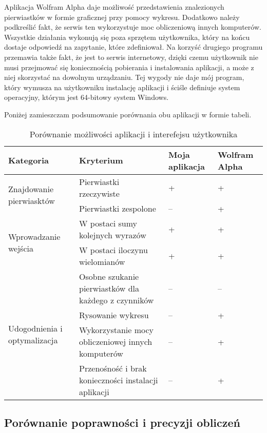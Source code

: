 Aplikacja Wolfram Alpha daje możliwość przedstawienia znalezionych pierwiastków w formie graficznej przy pomocy wykresu. Dodatkowo należy podkreślić fakt, że serwis ten wykorzystuje moc obliczeniową innych komputerów. Wszystkie działania wykonują się poza sprzętem użytkownika, który na końcu dostaje odpowiedź na zapytanie, które zdefiniował. Na korzyść drugiego programu przemawia także fakt, że jest to serwis internetowy, dzięki czemu użytkownik nie musi przejmować się koniecznością pobierania i instalowania aplikacji, a może z niej skorzystać na dowolnym urządzaniu. Tej wygody nie daje mój program, który wymusza na użytkowniku instalację aplikacji i ściśle definiuje system operacyjny, którym jest 64-bitowy system Windows.

Poniżej zamieszczam podsumowanie porównania obu aplikacji w formie tabeli.

\begin{table}
\caption{Porównanie możliwości aplikacji i interefejsu użytkownika}
	\begin{tabular}{ |p{4.7cm}|p{5.5cm}|p{1.5cm}|p{1.5cm}| } 
		\hline
		Kategoria & Kryterium & Moja aplikacja & Wolfram Alpha \\
		\hline
		\multirow{2}{*}{Znajdowanie pierwiasktów}
		& Pierwiastki rzeczywiste & + & + \\
		& Pierwiastki zespolone & -- & + \\
		\hline
		\multirow{2}{*}{Wprowadzanie wejścia}
		&W postaci sumy kolejnych wyrazów & + & + \\
		&W postaci iloczynu wielomianów & + & + \\
		\hline
		\multirow{4}{*}{Udogodnienia i optymalizacja}
		&Osobne szukanie pierwiastków dla każdego z czynników & -- & -- \\
		&Rysowanie wykresu & -- & + \\
		&Wykorzystanie mocy obliczeniowej innych komputerów & -- & + \\
		&Przenośność i brak konieczności instalacji aplikacji & -- & + \\
		\hline
	\end{tabular}
\end{table}

\subsection {Porównanie poprawności i precyzji obliczeń}

